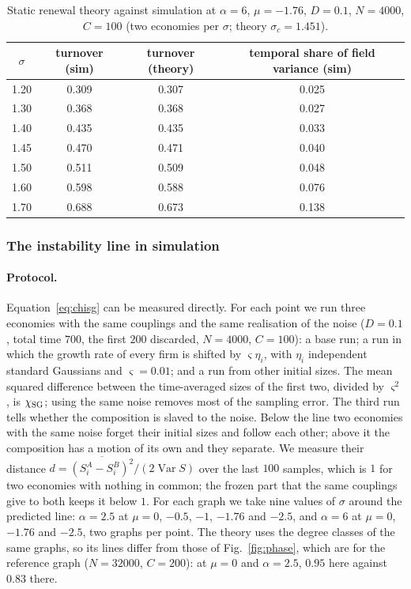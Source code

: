 \documentclass[pre,twocolumn,superscriptaddress,nofootinbib]{revtex4-2}
\newcommand{\Var}{\operatorname{Var}}
\begin{document}
\begin{table}[t]
\caption{Static renewal theory against simulation at $\alpha=6$, $\mu=-1.76$, $D=0.1$, $N=4000$, $C=100$ (two economies
per $\sigma$; theory $\sigma_c=1.451$).}
\label{tab:phase}
\begin{ruledtabular}
\begin{tabular}{cccc}
$\sigma$ & turnover (sim) & turnover (theory) & temporal share of field variance (sim)\\
\hline
1.20 & 0.309 & 0.307 & 0.025\\
1.30 & 0.368 & 0.368 & 0.027\\
1.40 & 0.435 & 0.435 & 0.033\\
1.45 & 0.470 & 0.471 & 0.040\\
1.50 & 0.511 & 0.509 & 0.048\\
1.60 & 0.598 & 0.588 & 0.076\\
1.70 & 0.688 & 0.673 & 0.138\\
\end{tabular}
\end{ruledtabular}
\end{table}

\subsubsection{The instability line in simulation}
\label{app:linetest}

\paragraph{Protocol.}  Equation~\eqref{eq:chisg} can be measured directly.  For each point we run three economies with
the same couplings and the same realisation of the noise ($D=0.1$, total time $700$, the first $200$ discarded,
$N=4000$, $C=100$): a base run; a run in which the growth rate of every firm is shifted by $\varsigma\eta_i$, with
$\eta_i$ independent standard Gaussians and $\varsigma=0.01$; and a run from other initial sizes.  The mean squared
difference between the time-averaged sizes of the first two, divided by $\varsigma^2$, is $\chi_{\rm SG}$; using the
same noise removes most of the sampling error.  The third run tells whether the composition is slaved to the
noise.  Below the line two economies with the same noise forget their initial sizes and follow each other;
above it the composition has a motion of its own and they separate.  We measure their distance
$d=\overline{(S_i^A-S_i^B)^2}/(2\Var S)$ over the last $100$ samples, which is $1$ for two economies with nothing in common; the frozen part that the same couplings give to both keeps it below $1$.  For
each graph we take nine values of $\sigma$ around the predicted line: $\alpha=2.5$ at $\mu=0$, $-0.5$, $-1$, $-1.76$ and
$-2.5$, and $\alpha=6$ at $\mu=0$, $-1.76$ and $-2.5$, two graphs per point.  The theory uses the degree classes of the
same graphs, so its lines differ from those of Fig.~\ref{fig:phase}, which are for the reference graph ($N=32000$,
$C=200$): at $\mu=0$ and $\alpha=2.5$, $0.95$ here against $0.83$ there.
\end{document}
